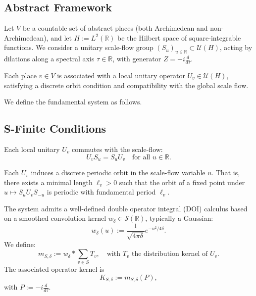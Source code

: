 \subsection{Abstract Framework}

Let \( V \) be a countable set of abstract places (both Archimedean and non-Archimedean), and let \( H := L^2(\mathbb{R}) \) be the Hilbert space of square-integrable functions. We consider a unitary scale-flow group \( (S_u)_{u \in \mathbb{R}} \subset \mathcal{U}(H) \), acting by dilations along a spectral axis \( \tau \in \mathbb{R} \), with generator \( Z = -i \frac{d}{d\tau} \).

Each place \( v \in V \) is associated with a local unitary operator \( U_v \in \mathcal{U}(H) \), satisfying a discrete orbit condition and compatibility with the global scale flow.

We define the fundamental system as follows.

\subsection{S-Finite Conditions}

\begin{assumption}
Each local unitary \( U_v \) commutes with the scale-flow:
\[
U_v S_u = S_u U_v \quad \text{for all } u \in \mathbb{R}.
\]
\end{assumption}

\begin{assumption}
Each \( U_v \) induces a discrete periodic orbit in the scale-flow variable \( u \). That is, there exists a minimal length \( \ell_v > 0 \) such that the orbit of a fixed point under \( u \mapsto S_u U_v S_{-u} \) is periodic with fundamental period \( \ell_v \).
\end{assumption}

\begin{assumption}
The system admits a well-defined double operator integral (DOI) calculus based on a smoothed convolution kernel \( w_\delta \in \mathcal{S}(\mathbb{R}) \), typically a Gaussian:
\[
w_\delta(u) := \frac{1}{\sqrt{4\pi \delta}} e^{-u^2 / 4\delta}.
\]
We define:
\[
m_{S,\delta} := w_\delta * \sum_{v \in S} T_v, \quad \text{with } T_v \text{ the distribution kernel of } U_v.
\]
The associated operator kernel is
\[
K_{S,\delta} := m_{S,\delta}(P),
\]
with \( P := -i \frac{d}{d\tau} \).
\end{assumption}

